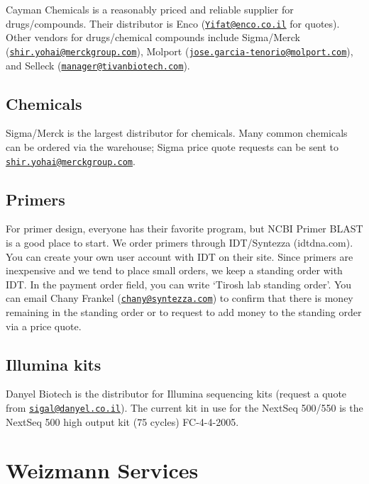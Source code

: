 \documentclass[]{book}
\begin{document}
Cayman Chemicals is a reasonably priced and reliable supplier for
drugs/compounds. Their distributor is Enco
(\href{mailto:Yifat@enco.co.il}{\nolinkurl{Yifat@enco.co.il}} for
quotes). Other vendors for drugs/chemical compounds include Sigma/Merck
(\href{mailto:shir.yohai@merckgroup.com}{\nolinkurl{shir.yohai@merckgroup.com}}),
Molport
(\href{mailto:jose.garcia-tenorio@molport.com}{\nolinkurl{jose.garcia-tenorio@molport.com}}),
and Selleck
(\href{mailto:manager@tivanbiotech.com}{\nolinkurl{manager@tivanbiotech.com}}).

\section{Chemicals}\label{chemicals}

Sigma/Merck is the largest distributor for chemicals. Many common
chemicals can be ordered via the warehouse; Sigma price quote requests
can be sent to
\href{mailto:shir.yohai@merckgroup.com}{\nolinkurl{shir.yohai@merckgroup.com}}.

\section{Primers}\label{primers}

For primer design, everyone has their favorite program, but NCBI Primer
BLAST is a good place to start. We order primers through IDT/Syntezza
(idtdna.com). You can create your own user account with IDT on their
site. Since primers are inexpensive and we tend to place small orders,
we keep a standing order with IDT. In the payment order field, you can
write `Tirosh lab standing order'. You can email Chany Frankel
(\href{mailto:chany@syntezza.com}{\nolinkurl{chany@syntezza.com}}) to
confirm that there is money remaining in the standing order or to
request to add money to the standing order via a price quote.

\section{Illumina kits}\label{illumina-kits}

Danyel Biotech is the distributor for Illumina sequencing kits (request
a quote from
\href{mailto:sigal@danyel.co.il}{\nolinkurl{sigal@danyel.co.il}}). The
current kit in use for the NextSeq 500/550 is the NextSeq 500 high
output kit (75 cycles) FC-4-4-2005.

\chapter{Weizmann Services}\label{wisServices}
\end{document}
